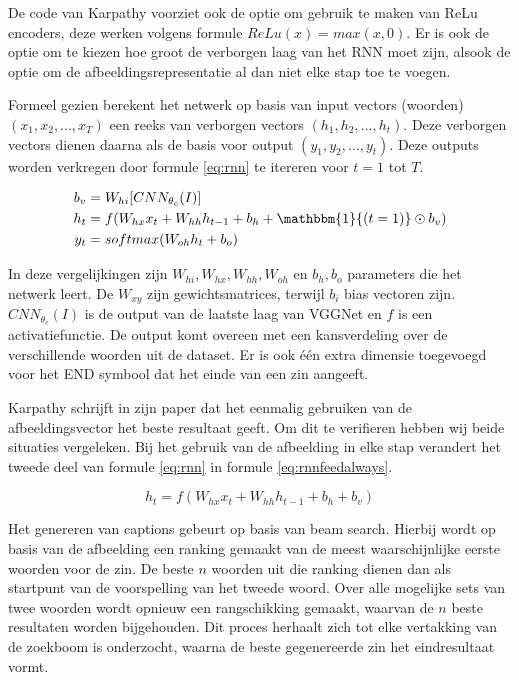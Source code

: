 De code van Karpathy voorziet ook de optie om gebruik te maken van ReLu encoders, deze werken volgens formule $ReLu(x) = max(x,0)$. Er is ook de optie om te kiezen hoe groot de verborgen laag van het RNN moet zijn, alsook de optie om de afbeeldingsrepresentatie al dan niet elke stap toe te voegen.

Formeel gezien berekent het netwerk op basis van input vectors (woorden) $(x_1,x_2,...,x_T)$ een reeks van verborgen vectors $(h_1,h_2,...,h_t)$. Deze verborgen vectors dienen daarna als de basis voor output $(y_1,y_2,...,y_t)$. Deze outputs worden verkregen door formule \eqref{eq:rnn} te itereren voor $t = 1$ tot $T$.

\begin{equation}
\begin{aligned}
     b_v &= W_{hi} [CNN_{\theta_c}(I)] \\
     h_t &= f(W_{hx} x_{t} + W_{hh} h_{t-1} + b_h + \mathbbm{1}{(t=1)} \odot b_v) \\
     y_t &= softmax( W_{oh} h_t + b_o)
\end{aligned}
\label{eq:rnn}
\end{equation}

In deze vergelijkingen zijn $W_{hi}, W_{hx}, W_{hh}, W_{oh}$ en $b_h, b_o$ parameters die het netwerk leert. De $W_{xy}$ zijn gewichtsmatrices, terwijl $b_i$ bias vectoren zijn. $CNN_{\theta_c}(I)$ is de output van de laatste laag van VGGNet en $f$ is een activatiefunctie. De output komt overeen met een kansverdeling over de verschillende woorden uit de dataset. Er is ook \'e\'en extra dimensie toegevoegd voor het END symbool dat het einde van een zin aangeeft. 

Karpathy schrijft in zijn paper dat het eenmalig gebruiken van de afbeeldingsvector het beste resultaat geeft. Om dit te verifieren hebben wij beide situaties vergeleken. Bij het gebruik van de afbeelding in elke stap verandert het tweede deel van formule \eqref{eq:rnn} in formule \eqref{eq:rnnfeedalways}.

\begin{equation}
     h_t = f(W_{hx} x_{t} + W_{hh} h_{t-1} + b_h + b_v)
\label{eq:rnnfeedalways}
\end{equation}

Het genereren van captions gebeurt op basis van beam search. Hierbij wordt op basis van de afbeelding een ranking gemaakt van de meest waarschijnlijke eerste woorden voor de zin. De beste $n$ woorden uit die ranking dienen dan als startpunt van de voorspelling van het tweede woord. Over alle mogelijke sets van twee woorden wordt opnieuw een rangschikking gemaakt, waarvan de $n$ beste resultaten worden bijgehouden. Dit proces herhaalt zich tot elke vertakking van de zoekboom is onderzocht, waarna de beste gegenereerde zin het eindresultaat vormt. 

